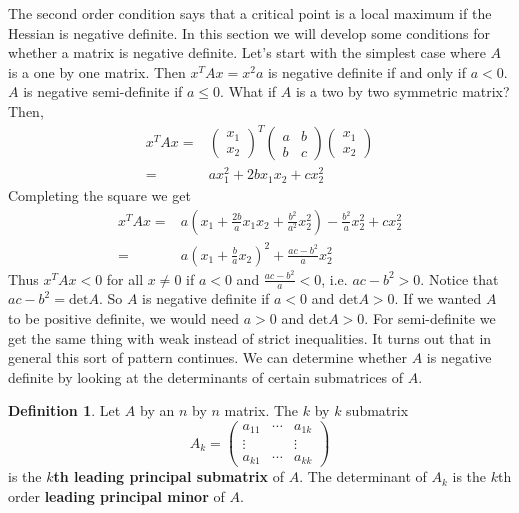 \documentclass[12pt,reqno]{amsart}
\theoremstyle{definition}
\newtheorem{definition}{Definition}[section]
\renewcommand{\det}{\mathrm{det}}
\begin{document}
The second order condition says that a critical point is a local
maximum if the Hessian is negative definite. In this section we will
develop some conditions for whether a matrix is negative
definite. Let's start with the simplest case where $A$ is a one by one
matrix. Then $x^T A x = x^2 a$ is negative definite if and only if $a
< 0$. $A$ is negative semi-definite if $a\leq 0$. What if $A$ is a two
by two symmetric matrix? Then,
\begin{align*}
  x^T A x = & \begin{pmatrix} x_1 \\ x_2 \end{pmatrix}^T 
  \begin{pmatrix}
    a & b \\ b & c 
  \end{pmatrix}
  \begin{pmatrix} x_1 \\ x_2 \end{pmatrix}
  \\ 
  = & a x_1^2 + 2b x_1 x_2 + c x_2^2
\end{align*}
Completing the square we get
\begin{align*}
  x^T A x = & a\left(x_1 + \frac{2b}{a} x_1 x_2 + \frac{b^2}{a^2}
    x_2^2\right) - \frac{b^2}{a} x_2^2 + c x_2^2 \\
  = &a\left(x_1 + \frac{b}{a} x_2\right)^2 + \frac{ac-b^2}{a} x_2^2 
\end{align*}
Thus $x^T A x < 0$ for all $x \neq 0$ if $a < 0$ and
$\frac{ac-b^2}{a}<0$, i.e. $ac - b^2 > 0$. Notice that $ac - b^2 =
\det A$. So $A$ is negative definite if $a<0$ and $\det A > 0$. If we
wanted $A$ to be positive definite, we would need $a>0$ and $\det A >
0$. For semi-definite we get the same thing with weak instead of
strict inequalities. It turns out that in general this sort of pattern
continues. We can determine whether $A$ is negative definite by
looking at the determinants of certain submatrices of $A$.
\begin{definition}
  Let $A$ by an $n$ by $n$ matrix. The $k$ by $k$ submatrix 
  \[ A_k = \begin{pmatrix} a_{11} & \cdots & a_{1k} \\
    \vdots & & \vdots \\
    a_{k1} & \cdots & a_{kk} \end{pmatrix} \]
  is the \textbf{$k$th leading principal submatrix} of $A$. The
  determinant of $A_k$ is the $k$th order \textbf{leading principal
    minor} of $A$.
\end{definition}
\end{document}
